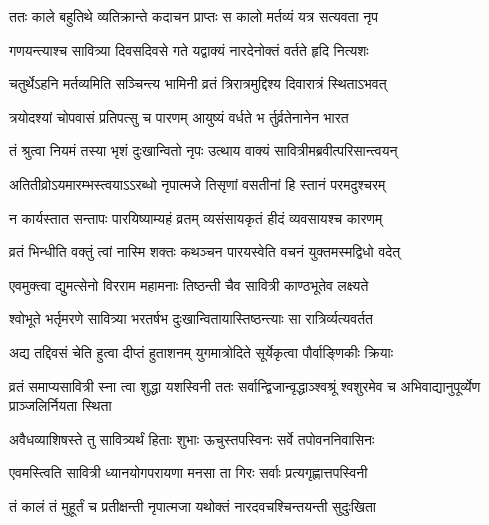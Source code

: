 
\twolineshloka
{ततः काले बहुतिथे व्यतिक्रान्ते कदाचन}
{प्राप्तः स कालो मर्तव्यं यत्र सत्यवता नृप}


\twolineshloka
{गणयन्त्याश्च सावित्र्या दिवसदिवसे गते}
{यद्वाक्यं नारदेनोक्तं वर्तते हृदि नित्यशः}


\twolineshloka
{चतुर्थेऽहनि मर्तव्यमिति सञ्चिन्त्य भामिनी}
{व्रतं त्रिरात्रमुद्दिश्य दिवारात्रं स्थिताऽभवत्}


\twolineshloka
{त्रयोदश्यां चोपवासं प्रतिपत्सु च पारणम्}
{आयुष्यं वर्धते भ र्तुर्व्रतेनानेन भारत}


\twolineshloka
{तं श्रुत्वा नियमं तस्या भृशं दुःखान्वितो नृपः}
{उत्थाय वाक्यं सावित्रीमब्रवीत्परिसान्त्वयन्}


\twolineshloka
{अतितीव्रोऽयमारम्भस्त्वयाऽऽरब्धो नृपात्मजे}
{तिसृणां वसतीनां हि स्तानं परमदुश्चरम्}




\twolineshloka
{न कार्यस्तात सन्तापः पारयिष्याम्यहं व्रतम्}
{व्यसंसायकृतं हीदं व्यवसायश्च कारणम्}




\twolineshloka
{व्रतं भिन्धीति वक्तुं त्वां नास्मि शक्तः कथञ्चन}
{पारयस्वेति वचनं युक्तमस्मद्विधो वदेत्}




\twolineshloka
{एवमुक्त्वा द्युमत्सेनो विरराम महामनाः}
{तिष्ठन्ती चैव सावित्री काण्ठभूतेव लक्ष्यते}


\twolineshloka
{श्वोभूते भर्तृमरणे सावित्र्या भरतर्षभ}
{दुःखान्वितायास्तिष्ठन्त्याः सा रात्रिर्व्यत्यवर्तत}


\twolineshloka
{अद्य तद्दिवसं चेति हुत्वा दीप्तं हुताशनम्}
{युगमात्रोदिते सूर्येकृत्वा पौर्वाङ्णिकीः क्रियाः}


\threelineshloka
{व्रतं समाप्यसावित्री स्ना त्वा शुद्धा यशस्विनी}
{ततः सर्वान्द्विजान्वृद्धाञ्श्वश्रूं श्वशुरमेव च}
{अभिवाद्यानुपूर्व्येण प्राञ्जलिर्नियता स्थिता}


\twolineshloka
{अवैधव्याशिषस्ते तु सावित्र्यर्थं हिताः शुभाः}
{ऊचुस्तपस्विनः सर्वे तपोवननिवासिनः}


\twolineshloka
{एवमस्त्विति सावित्री ध्यानयोगपरायणा}
{मनसा ता गिरः सर्वाः प्रत्यगृह्णात्तपस्विनी}


\twolineshloka
{तं कालं तं मुहूर्तं च प्रतीक्षन्ती नृपात्मजा}
{यथोक्तं नारदवचश्चिन्तयन्ती सुदुःखिता}



